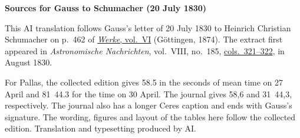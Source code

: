 \clearpage\thispagestyle{empty}
\begin{center}\textbf{Sources for Gauss to Schumacher (20 July 1830)}\end{center}
\noindent This AI translation follows Gauss’s letter of 20 July 1830 to Heinrich Christian Schumacher on p.~462 of \href{https://gdz.sub.uni-goettingen.de/id/PPN236007467}{\textit{Werke}, vol.~VI} (Göttingen, 1874). The extract first appeared in \textit{Astronomische Nachrichten}, vol.~VIII, no.~185, \href{https://api.digitale-sammlungen.de/iiif/image/v2/bsb10049433_00169/full/1800,/0/default.jpg}{cols.~321--322}, in August 1830.
\par\smallskip\noindent For Pallas, the collected edition gives 58.5 in the seconds of mean time on 27 April and 81~44.3 for the time on 30 April. The journal gives 58,6 and 31~44,3, respectively. The journal also has a longer Ceres caption and ends with Gauss’s signature. The wording, figures and layout of the tables here follow the collected edition. Translation and typesetting produced by AI.
\clearpage
